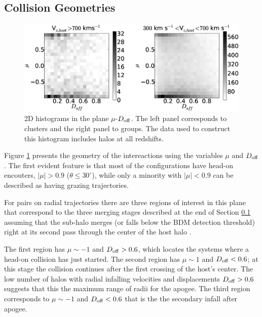 \documentclass{emulateapj}
\begin{document}
\subsection{Collision Geometries}
\label{sec:geometry}

\begin{figure}
\begin{center}
\includegraphics[width=1.0\textwidth]{figure_2.eps}
\end{center}
\caption{2D histograms in the plane $\mu$-$D_{\rm off}$. The left
  panel corresponds to clusters and the right panel to groups. The data
  used to construct this histogram includes halos at all redshifts.}
\label{fig:geometry}
\end{figure}

Figure \ref{fig:geometry} presents the geometry of the intereactions using the 
variables $\mu$ and $D_{\rm off}$. The first evident feature is that
most of the configurations have head-on encouters, $|\mu|>0.9$
($\theta\leq 30^{\circ}$), while only a minority with $|\mu|<0.9$ can
be described as having  grazing trajectories. 

For pairs on radial trajectories there are three regions of interest
in this plane that correspond to the three merging stages described
at the end of Section \ref{sec:geometry} assuming that the sub-halo
merges (or falls below the BDM detection threshold) right at its
second pass through the center of the host halo \citep{Poole2006}.  

The first region has $\mu\sim-1$ and $D_{\rm off}>0.6$, which
locates the systems where a head-on collision has just started. The
second region has $\mu\sim 1$ and $D_{\rm off}<0.6$; at this stage
the collision continues after the first crossing of the host's
center. The low number of halos with radial infalling velocities and
displacements $D_{\rm off}>0.6$ suggests that this the maximum range of
radii for the apogee.  The third region corresponds to $\mu\sim-1$
and $D_{\rm off}<0.6$ that is the the secondary infall after apogee.  
\end{document}
